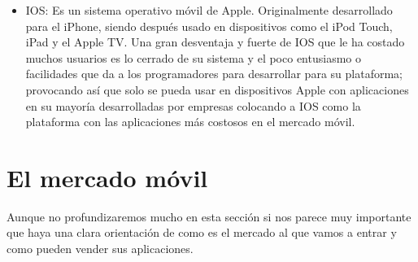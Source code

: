 \documentclass[11pt]{book}
\begin{document}
\begin{itemize}
\item IOS: Es un sistema operativo móvil de Apple. Originalmente desarrollado para el iPhone, siendo después usado en dispositivos como el iPod Touch, iPad y el Apple TV. Una gran desventaja y fuerte de IOS que le ha costado muchos usuarios es lo cerrado de su sistema y el poco entusiasmo o facilidades que da a los programadores para desarrollar para su plataforma; provocando así que solo se pueda usar en dispositivos Apple con aplicaciones en su mayoría desarrolladas por empresas colocando a IOS como la plataforma con las aplicaciones más costosos en el mercado móvil.

\end{itemize}

\newpage
\section{El mercado móvil} 
Aunque no profundizaremos mucho en esta sección si nos parece muy importante que haya una clara orientación de como es el mercado al que vamos a entrar y como pueden vender sus aplicaciones.
\end{document}
